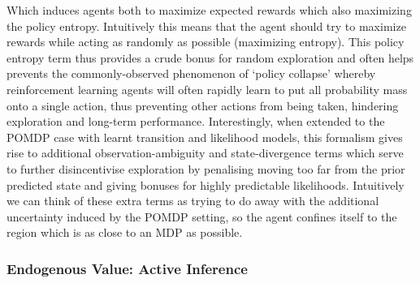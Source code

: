 Which induces agents both to maximize expected rewards which also maximizing the policy entropy. Intuitively this means that the agent should try to maximize rewards while acting as randomly as possible (maximizing entropy). This policy entropy term thus provides a crude bonus for random exploration and often helps prevents the commonly-observed phenomenon of `policy collapse' \citep{fujimoto2018addressing} whereby reinforcement learning agents will often rapidly learn to put all probability mass onto a single action, thus preventing other actions from being taken, hindering exploration and long-term performance. Interestingly, when extended to the POMDP case with learnt transition and likelihood models, this formalism gives rise to additional observation-ambiguity and state-divergence terms which serve to further disincentivise exploration by penalising moving too far from the prior predicted state and giving bonuses for highly predictable likelihoods. Intuitively we can think of these extra terms as trying to do away with the additional uncertainty induced by the POMDP setting, so the agent confines itself to the region which is as close to an MDP as possible.

\subsubsection{Endogenous Value: Active Inference}

